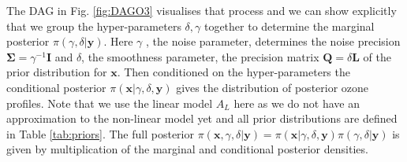 The DAG in Fig. \ref{fig:DAGO3} visualises that process and we can show explicitly that we group the hyper-parameters $\delta, \gamma$ together to determine the marginal posterior $\pi(\gamma, \delta | \bm{y})$.
Here $\gamma$ , the noise parameter, determines the noise precision $\bm{\Sigma} = \gamma ^{-1} \bm{I}$ and $\delta$, the smoothness parameter, the precision matrix $\bm{Q} = \delta \bm{L}$ of the prior distribution for $\bm{x}$.
Then conditioned on the hyper-parameters the conditional posterior $\pi( \bm{x} |\gamma, \delta, \bm{y})$ gives the distribution of posterior ozone profiles.
Note that we use the linear model $A_L$ here as we do not have an approximation to the non-linear model yet and all prior distributions are defined in Table \ref{tab:priors}.
The full posterior $\pi(\bm{x},\gamma, \delta | \bm{y}) =  \pi(\bm{x}|\gamma, \delta ,\bm{y}) \pi(\gamma, \delta | \bm{y}) $ is given by multiplication of the marginal and conditional posterior densities. 

